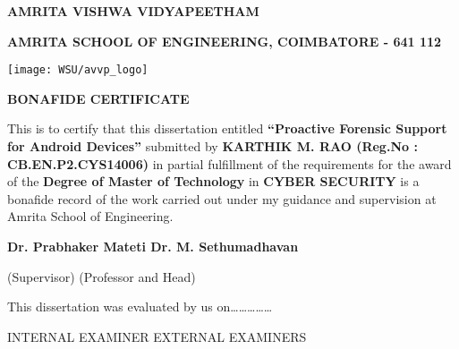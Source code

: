 \clearpage

  \begin{center}
\Large
\textbf{AMRITA VISHWA VIDYAPEETHAM}

\normalsize
\textbf{AMRITA SCHOOL OF ENGINEERING, COIMBATORE - 641 112}

\vspace*{22pt}
\texttt{[image: WSU/avvp\_logo]}

\vspace*{22pt}
\normalsize
\textbf{BONAFIDE CERTIFICATE}

\end{center}

\begin{sloppypar}
\noindent
This is to certify that this dissertation entitled \textbf{``Proactive Forensic Support for Android Devices''} submitted by \textbf{KARTHIK M. RAO (Reg.No : CB.EN.P2.CYS14006)} in partial fulfillment of the requirements for the award of the \textbf{Degree of Master of Technology} in \textbf{CYBER SECURITY} is a bonafide record of the work carried out under my guidance and supervision at Amrita School of Engineering.
\end{sloppypar}


\vspace*{52pt}
\begin{flushleft}
\noindent
\textbf{Dr. Prabhaker Mateti \hspace*{165pt}Dr. M. Sethumadhavan}

\vspace*{5pt}
\noindent
\hspace*{35pt}(Supervisor)
\hspace*{212pt}
(Professor and Head)
\end{flushleft}



\vspace*{20pt}
\begin{flushleft}
\noindent
This dissertation was evaluated by us on\ldots\ldots\ldots\ldots\ldots
\end{flushleft}

\vspace*{52pt}
\begin{flushleft}
\noindent
INTERNAL EXAMINER \hspace*{150pt} EXTERNAL EXAMINERS
\end{flushleft}

